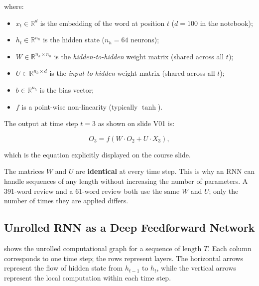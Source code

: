 \documentclass[12pt,a4paper]{article}
\newcommand{\tanh}{\operatorname{tanh}}
\begin{document}
where:
\begin{itemize}[noitemsep]
  \item $x_t \in \mathbb{R}^{d}$ is the embedding of the word at
        position $t$ ($d = 100$ in the notebook);
  \item $h_t \in \mathbb{R}^{n_h}$ is the hidden state ($n_h = 64$
        neurons);
  \item $W \in \mathbb{R}^{n_h \times n_h}$ is the
        \emph{hidden-to-hidden} weight matrix (shared across all $t$);
  \item $U \in \mathbb{R}^{n_h \times d}$ is the
        \emph{input-to-hidden} weight matrix (shared across all $t$);
  \item $b \in \mathbb{R}^{n_h}$ is the bias vector;
  \item $f$ is a point-wise non-linearity (typically $\tanh$).
\end{itemize}

The output at time step $t=3$ as shown on slide V01 is:

\begin{equation}
  O_3 = f\!\left(W \cdot O_2 + U \cdot X_3\right),
  \label{eq:o3}
\end{equation}

which is the equation explicitly displayed on the course slide.

\begin{keyinsight}[title=Parameter Sharing is the Key]
  The matrices $W$ and $U$ are \textbf{identical} at every time step.
  This is why an RNN can handle sequences of any length without
  increasing the number of parameters.  A 391-word review and a
  61-word review both use the same $W$ and $U$; only the number of
  times they are applied differs.
\end{keyinsight}

\subsection{Unrolled RNN as a Deep Feedforward Network}
\label{subsec:unrolled}

 shows the unrolled computational graph for a
sequence of length $T$.  Each column corresponds to one time step;
the rows represent layers.  The horizontal arrows represent the flow
of hidden state from $h_{t-1}$ to $h_t$, while the vertical arrows
represent the local computation within each time step.
\end{document}
